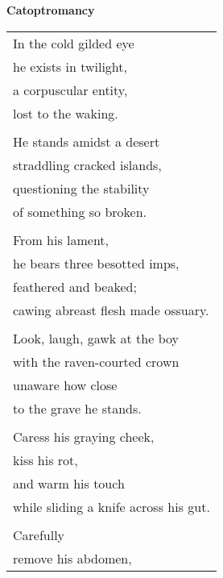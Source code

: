 \documentclass{article}
\begin{document}
\newcommand{\h}{\hspace*{4ex}}

%
%
%
%

\begin{center}
\textbf{Catoptromancy}
\vspace*{2ex}
\begin{longtable}{l}
In the cold gilded eye \\
\h{}he exists in twilight, \\
\h{}a corpuscular entity, \\ %
\h{}lost to the waking. \\
\\
He stands amidst a desert \\
\h{}straddling cracked islands, \\
\h{}questioning the stability \\
\h{}of something so broken. \\
\\
From his lament, \\
\h{}he bears three besotted imps, \\
\h{}feathered and beaked; \\
\h{}cawing abreast flesh made ossuary. \\
\\
\h{}Look, laugh, gawk at the boy \\
with the raven-courted crown \\
unaware how close \\
to the grave he stands. \\
\\
\h{}Caress his graying cheek, \\
kiss his rot, \\
and warm his touch \\
while sliding a knife across his gut. \\
\\
\h{}Carefully \\
remove his abdomen, \\

\end{longtable}
\end{center}
\end{document}
